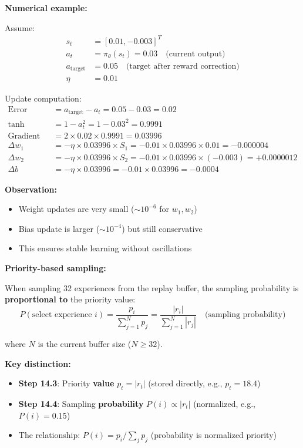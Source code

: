 \documentclass[11pt,a4paper]{article}
\begin{document}
\begin{itemize}
\textbf{Numerical example:}

Assume:
\begin{align*}
s_t &= [0.01, -0.003]^T \\
a_t &= \pi_\theta(s_t) = 0.03 \quad \text{(current output)} \\
a_{\text{target}} &= 0.05 \quad \text{(target after reward correction)} \\
\eta &= 0.01
\end{align*}

Update computation:
\begin{align*}
\text{Error} &= a_{\text{target}} - a_t = 0.05 - 0.03 = 0.02 \\
\text{tanh derivative} &= 1 - a_t^2 = 1 - 0.03^2 = 0.9991 \\
\text{Gradient factor} &= 2 \times 0.02 \times 0.9991 = 0.03996 \\
\Delta w_1 &= -\eta \times 0.03996 \times S_1 = -0.01 \times 0.03996 \times 0.01 = -0.000004 \\
\Delta w_2 &= -\eta \times 0.03996 \times S_2 = -0.01 \times 0.03996 \times (-0.003) = +0.0000012 \\
\Delta b &= -\eta \times 0.03996 = -0.01 \times 0.03996 = -0.0004
\end{align*}

\textbf{Observation:}
\begin{itemize}
    \item Weight updates are very small ($\sim 10^{-6}$ for $w_1, w_2$)
    \item Bias update is larger ($\sim 10^{-4}$) but still conservative
    \item This ensures stable learning without oscillations
\end{itemize}

\textbf{Priority-based sampling:}

When sampling 32 experiences from the replay buffer, the sampling probability is \textbf{proportional to} the priority value:
\begin{equation}
P(\text{select experience } i) = \frac{p_i}{\sum_{j=1}^{N} p_j} = \frac{|r_i|}{\sum_{j=1}^{N} |r_j|} \quad \text{(sampling probability)}
\end{equation}

where $N$ is the current buffer size ($N \geq 32$).

\textbf{Key distinction:}
\begin{itemize}
    \item \textbf{Step 14.3}: Priority \textbf{value} $p_t = |r_t|$ (stored directly, e.g., $p_t = 18.4$)
    \item \textbf{Step 14.4}: Sampling \textbf{probability} $P(i) \propto |r_t|$ (normalized, e.g., $P(i) = 0.15$)
    \item The relationship: $P(i) = p_i / \sum_j p_j$ (probability is normalized priority)
\end{itemize}


\end{itemize}
\end{document}
